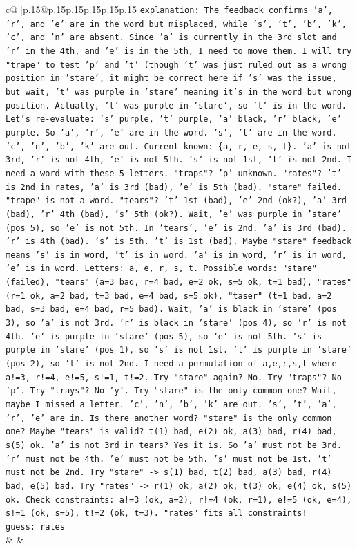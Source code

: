 \documentclass{article}
\begin{document}
{\begin{supertabular}{c@{$\;$}|p{.15\linewidth}@{}p{.15\linewidth}p{.15\linewidth}p{.15\linewidth}p{.15\linewidth}p{.15\linewidth}}
{{{                \texttt{explanation: The feedback confirms 'a', 'r', and 'e' are in the word but misplaced, while 's', 't', 'b', 'k', 'c', and 'n' are absent. Since 'a' is currently in the 3rd slot and 'r' in the 4th, and 'e' is in the 5th, I need to move them. I will try "trape" to test 'p' and 't' (though 't' was just ruled out as a wrong position in 'stare', it might be correct here if 's' was the issue, but wait, 't' was purple in 'stare' meaning it's in the word but wrong position. Actually, 't' was purple in 'stare', so 't' is in the word. Let's re{-}evaluate: 's' purple, 't' purple, 'a' black, 'r' black, 'e' purple. So 'a', 'r', 'e' are in the word. 's', 't' are in the word. 'c', 'n', 'b', 'k' are out. Current known: \{a, r, e, s, t\}. 'a' is not 3rd, 'r' is not 4th, 'e' is not 5th. 's' is not 1st, 't' is not 2nd. I need a word with these 5 letters. "traps"? 'p' unknown. "rates"? 't' is 2nd in rates, 'a' is 3rd (bad), 'e' is 5th (bad). "stare" failed. "trape" is not a word. "tears"? 't' 1st (bad), 'e' 2nd (ok?), 'a' 3rd (bad), 'r' 4th (bad), 's' 5th (ok?). Wait, 'e' was purple in 'stare' (pos 5), so 'e' is not 5th. In 'tears', 'e' is 2nd. 'a' is 3rd (bad). 'r' is 4th (bad). 's' is 5th. 't' is 1st (bad). Maybe "stare" feedback means 's' is in word, 't' is in word. 'a' is in word, 'r' is in word, 'e' is in word. Letters: a, e, r, s, t. Possible words: "stare" (failed), "tears" (a=3 bad, r=4 bad, e=2 ok, s=5 ok, t=1 bad), "rates" (r=1 ok, a=2 bad, t=3 bad, e=4 bad, s=5 ok), "taser" (t=1 bad, a=2 bad, s=3 bad, e=4 bad, r=5 bad). Wait, 'a' is black in 'stare' (pos 3), so 'a' is not 3rd. 'r' is black in 'stare' (pos 4), so 'r' is not 4th. 'e' is purple in 'stare' (pos 5), so 'e' is not 5th. 's' is purple in 'stare' (pos 1), so 's' is not 1st. 't' is purple in 'stare' (pos 2), so 't' is not 2nd. I need a permutation of a,e,r,s,t where a!=3, r!=4, e!=5, s!=1, t!=2. Try "stare" again? No. Try "traps"? No 'p'. Try "trays"? No 'y'. Try "stare" is the only common one? Wait, maybe I missed a letter. 'c', 'n', 'b', 'k' are out. 's', 't', 'a', 'r', 'e' are in. Is there another word? "stare" is the only common one? Maybe "tears" is valid? t(1) bad, e(2) ok, a(3) bad, r(4) bad, s(5) ok. 'a' is not 3rd in tears? Yes it is. So 'a' must not be 3rd. 'r' must not be 4th. 'e' must not be 5th. 's' must not be 1st. 't' must not be 2nd. Try "stare" {-}> s(1) bad, t(2) bad, a(3) bad, r(4) bad, e(5) bad. Try "rates" {-}> r(1) ok, a(2) ok, t(3) ok, e(4) ok, s(5) ok. Check constraints: a!=3 (ok, a=2), r!=4 (ok, r=1), e!=5 (ok, e=4), s!=1 (ok, s=5), t!=2 (ok, t=3). "rates" fits all constraints!} \\
\texttt{guess: rates} \\
            }
        }
    }
    & & \\ \\


\end{supertabular}}
\end{document}
